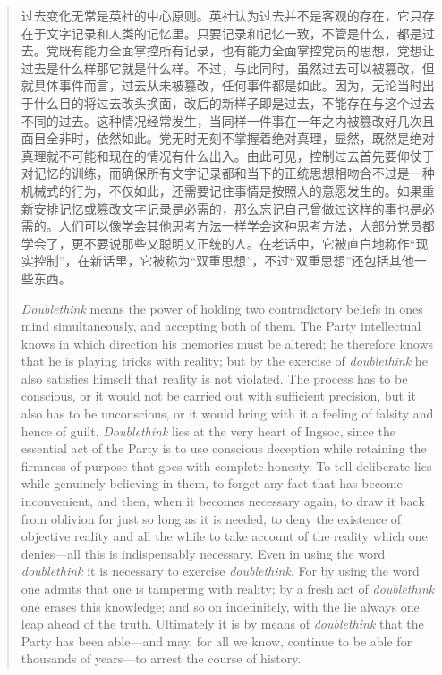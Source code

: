 \begin{paracol}{2}
\begin{quotation}
\switchcolumn

过去变化无常是英社的中心原则。英社认为过去并不是客观的存在，它只存在于文字记录和人类的记忆里。只要记录和记忆一致，不管是什么，都是过去。党既有能力全面掌控所有记录，也有能力全面掌控党员的思想，党想让过去是什么样那它就是什么样。不过，与此同时，虽然过去可以被篡改，但就具体事件而言，过去从未被篡改，任何事件都是如此。因为，无论当时出于什么目的将过去改头换面，改后的新样子即是过去，不能存在与这个过去不同的过去。这种情况经常发生，当同样一件事在一年之内被篡改好几次且面目全非时，依然如此。党无时无刻不掌握着绝对真理，显然，既然是绝对真理就不可能和现在的情况有什么出入。由此可见，控制过去首先要仰仗于对记忆的训练，而确保所有文字记录都和当下的正统思想相吻合不过是一种机械式的行为，不仅如此，还需要记住事情是按照人的意愿发生的。如果重新安排记忆或篡改文字记录是必需的，那么忘记自己曾做过这样的事也是必需的。人们可以像学会其他思考方法一样学会这种思考方法，大部分党员都学会了，更不要说那些又聪明又正统的人。在老话中，它被直白地称作``现实控制''，在新话里，它被称为``双重思想''，不过``双重思想''还包括其他一些东西。

\switchcolumn*

\emph{Doublethink} means the power of holding two contradictory beliefs
in one\textquotesingle s mind simultaneously, and accepting both of
them. The Party intellectual knows in which direction his memories must
be altered; he therefore knows that he is playing tricks with reality;
but by the exercise of \emph{doublethink} he also satisfies himself that
reality is not violated. The process has to be conscious, or it would
not be carried out with sufficient precision, but it also has to be
unconscious, or it would bring with it a feeling of falsity and hence of
guilt. \emph{Doublethink} lies at the very heart of Ingsoc, since the
essential act of the Party is to use conscious deception while retaining
the firmness of purpose that goes with complete honesty. To tell
deliberate lies while genuinely believing in them, to forget any fact
that has become inconvenient, and then, when it becomes necessary again,
to draw it back from oblivion for just so long as it is needed, to deny
the existence of objective reality and all the while to take account of
the reality which one denies---all this is indispensably necessary. Even
in using the word \emph{doublethink} it is necessary to exercise
\emph{doublethink}. For by using the word one admits that one is
tampering with reality; by a fresh act of \emph{doublethink} one erases
this knowledge; and so on indefinitely, with the lie always one leap
ahead of the truth. Ultimately it is by means of \emph{doublethink} that
the Party has been able---and may, for all we know, continue to be able
for thousands of years---to arrest the course of history.


\end{quotation}
\end{paracol}
